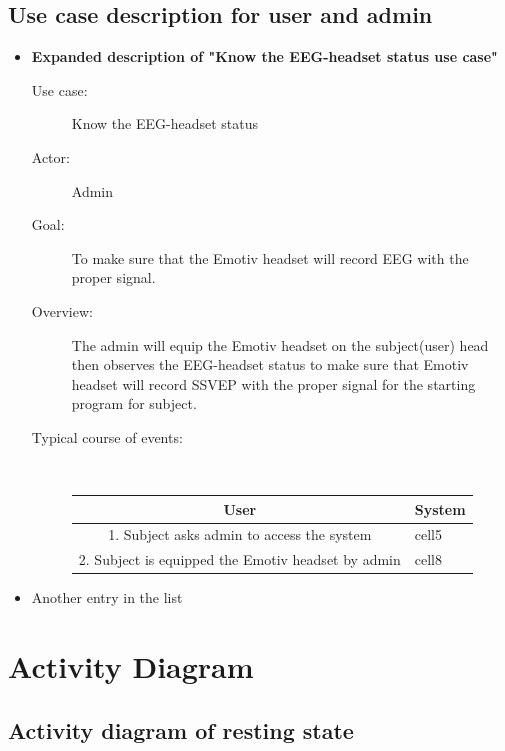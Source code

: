 \subsection{Use case description for user and admin}
\begin{itemize}
\item \textbf{Expanded description of "Know the EEG-headset status
use case" }

\begin{description}
\item [{Use case:}] Know the EEG-headset status 
\item [{Actor:}] Admin 
\item [{Goal:}] To make sure that the Emotiv headset will record EEG with
the proper signal. 
\item [{Overview:}] The admin will equip the Emotiv headset on the subject(user)
head then observes the EEG-headset status to make sure that Emotiv
headset will record SSVEP with the proper signal for the starting
program for subject. 
\item [{Typical course of events:}]~

{
	\centering

\begin{tabular}{ |c| m{8cm} | }
	
\hline 
\textbf{User} & \textbf{System}  \tabularnewline
\hline 
1. Subject asks admin to access the system & cell5  \tabularnewline
\hline 
2. Subject is equipped the Emotiv headset by admin  & cell8  \tabularnewline
\hline 
\end{tabular}
}

\end{description}
\item Another entry in the list 
\end{itemize}

\section{Activity Diagram}


\subsection{Activity diagram of resting state}

